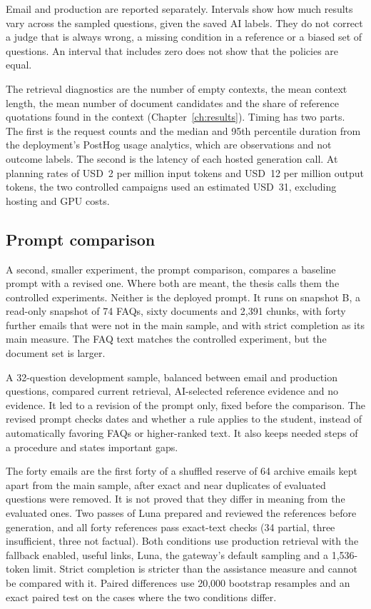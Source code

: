 Email and production are reported separately. Intervals show how much results vary across the sampled questions, given the saved AI labels. They do not correct a judge that is always wrong, a missing condition in a reference or a biased set of questions. An interval that includes zero does not show that the policies are equal.

The retrieval diagnostics are the number of empty contexts, the mean context length, the mean number of document candidates and the share of reference quotations found in the context (Chapter~\ref{ch:results}). Timing has two parts. The first is the request counts and the median and 95th percentile duration from the deployment's PostHog usage analytics, which are observations and not outcome labels. The second is the latency of each hosted generation call. At planning rates of USD~2 per million input tokens and USD~12 per million output tokens, the two controlled campaigns used an estimated USD~31, excluding hosting and GPU costs.

\subsection{Prompt comparison}
\label{sec:method-prompt}

A second, smaller experiment, the prompt comparison, compares a baseline prompt with a revised one. Where both are meant, the thesis calls them the controlled experiments. Neither is the deployed prompt. It runs on snapshot B, a read-only snapshot of 74 FAQs, sixty documents and 2,391 chunks, with forty further emails that were not in the main sample, and with strict completion as its main measure. The FAQ text matches the controlled experiment, but the document set is larger.

A 32-question development sample, balanced between email and production questions, compared current retrieval, AI-selected reference evidence and no evidence. It led to a revision of the prompt only, fixed before the comparison. The revised prompt checks dates and whether a rule applies to the student, instead of automatically favoring FAQs or higher-ranked text. It also keeps needed steps of a procedure and states important gaps.

The forty emails are the first forty of a shuffled reserve of 64 archive emails kept apart from the main sample, after exact and near duplicates of evaluated questions were removed. It is not proved that they differ in meaning from the evaluated ones. Two passes of Luna prepared and reviewed the references before generation, and all forty references pass exact-text checks (34 partial, three insufficient, three not factual). Both conditions use production retrieval with the fallback enabled, useful links, Luna, the gateway's default sampling and a 1,536-token limit. Strict completion is stricter than the assistance measure and cannot be compared with it. Paired differences use 20,000 bootstrap resamples and an exact paired test on the cases where the two conditions differ.

